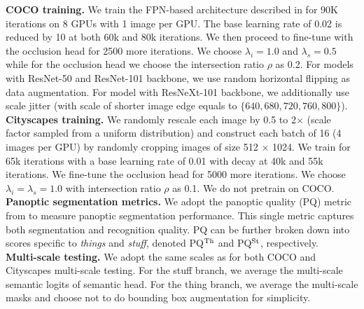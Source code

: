 \documentclass[10pt,twocolumn,letterpaper]{article}
\begin{document}
\noindent \textbf{COCO training.} We train the FPN-based architecture described in \cite{kirillov2019panoptic} for 90K iterations on 8 GPUs with 1 image per GPU. The base learning rate of 0.02 is reduced by 10 at both 60k and 80k iterations. We then proceed to fine-tune with the occlusion head for 2500 more iterations. We choose $\lambda_i = 1.0$ and $\lambda_s = 0.5$ while for the occlusion head we choose the intersection ratio $\rho$ as 0.2. For models with ResNet-50 and ResNet-101 backbone, we use random horizontal flipping as data augmentation. For model with ResNeXt-101 backbone, we additionally use scale jitter (with scale of shorter image edge equals to $\{640, 680, 720, 760, 800\}$).\\\noindent \textbf{Cityscapes training.} We randomly rescale each image by 0.5 to 2$\times$ (scale factor sampled from a uniform distribution) and construct each batch of 16 (4 images per GPU) by randomly cropping images of size 512 $\times$ 1024. We train for 65k iterations with a base learning rate of 0.01 with decay at 40k and 55k iterations. We fine-tune the occlusion head for 5000 more iterations. We choose $\lambda_i = \lambda_s = 1.0$ with intersection ratio $\rho$ as 0.1. We do not pretrain on COCO.\\ 
\noindent \textbf{Panoptic segmentation metrics.} We adopt the panoptic quality (PQ) metric from \cite{kirillov2018panoptic} to measure panoptic segmentation performance. This single metric captures both segmentation and recognition quality. PQ can be further broken down into scores specific to \textit{things} and \textit{stuff}, denoted PQ$\textsuperscript{Th}$ and PQ$\textsuperscript{St}$, respectively.\\
\noindent \textbf{Multi-scale testing.} We adopt the same scales as \cite{xiong2019upsnet} for both COCO and Cityscapes multi-scale testing. For the stuff branch, we average the multi-scale semantic logits of semantic head. For the thing branch, we average the multi-scale masks and choose not to do bounding box augmentation for simplicity.
\end{document}
